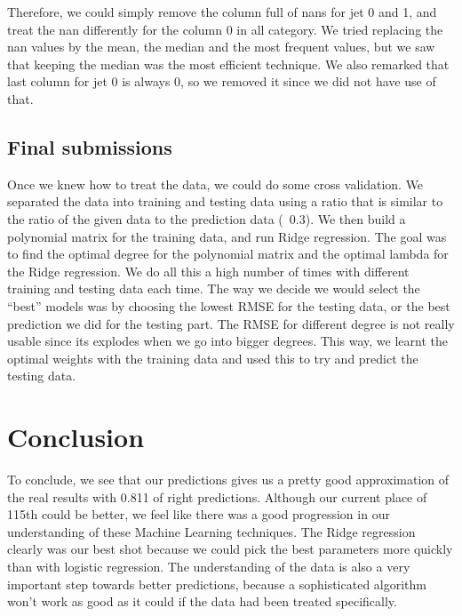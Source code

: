 \documentclass[10pt,conference,compsocconf]{IEEEtran}
\begin{document}
Therefore, we could simply remove the column full of nans for jet 0 and 1, and treat the nan differently for the column 0 in all category. We tried replacing the nan values by the mean, the median and the most frequent values, but we saw that keeping the median was the most efficient technique. We also remarked that last column for jet 0 is always 0, so we removed it since we did not have use of that.\\

\subsection{Final submissions}
Once we knew how to treat the data, we could do some cross validation. We separated the data into training and testing data using a ratio that is similar to the ratio of the given data to the prediction data (~0.3). We then build a polynomial matrix for the training data, and run Ridge regression. The goal was to find the optimal degree for the polynomial matrix and the optimal lambda for the Ridge regression. We do all this a high number of times with different training and testing data each time. The way we decide we would select the “best” models was by choosing the lowest RMSE for the testing data, or the best prediction we did for the testing part. The RMSE for different degree is not really usable since its explodes when we go into bigger degrees. This way, we learnt the optimal weights with the training data and used this to try and predict the testing data.\\


\section{Conclusion}
To conclude, we see that our predictions gives us a pretty good approximation of the real results with 0.811 of right predictions. Although our current place of 115th could be better, we feel like there was a good progression in our understanding of these Machine Learning techniques. The Ridge regression clearly was our best shot because we could pick the best parameters more quickly than with logistic regression. The understanding of the data is also a very important step towards better predictions, because a sophisticated algorithm won’t work as good as it could if the data had been treated specifically.



\end{document}
